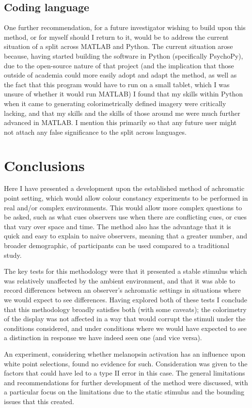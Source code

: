 \subsection{Coding language}

One further recommendation, for a future investigator wishing to build upon this method, or for myself should I return to it, would be to address the current situation of a split across \gls{MATLAB} and Python. The current situation arose because, having started building the software in Python (specifically PsychoPy), due to the open-source nature of that project (and the implication that those outside of academia could more easily adopt and adapt the method, as well as the fact that this program would have to run on a small tablet, which I was unsure of whether it would run \gls{MATLAB}) I found that my skills within Python when it came to generating colorimetrically defined imagery were critically lacking, and that my skills and the skills of those around me were much further advanced in \gls{MATLAB}. I mention this primarily so that any future user might not attach any false significance to the split across languages.

\section{Conclusions}

Here I have presented a development upon the established method of achromatic point setting, which would allow colour constancy experiments to be performed in real and/or complex environments. This would allow more complex questions to be asked, such as what cues observers use when there are conflicting cues, or cues that vary over space and time.
The method also has the advantage that it is quick and easy to explain to naive observers, meaning that a greater number, and broader demographic, of participants can be used compared to a traditional study.

The key tests for this methodology were that it presented a stable stimulus which was relatively unaffected by the ambient environment, and that it was able to record differences between an observer's achromatic settings in situations where we would expect to see differences. Having explored both of these tests I conclude that this methodology broadly satisfies both (with some caveats); the colorimetry of the display was not affected in a way that would corrupt the stimuli under the conditions considered, and under conditions where we would have expected to see a distinction in response we have indeed seen one (and vice versa).

An experiment, considering whether melanopsin activation has an influence upon white point selections, found no evidence for such. Consideration was given to the factors that could have led to a type II error in this case.
The general limitations and recommendations for further development of the method were discussed, with a particular focus on the limitations due to the static stimulus and the bounding issues that this created.




